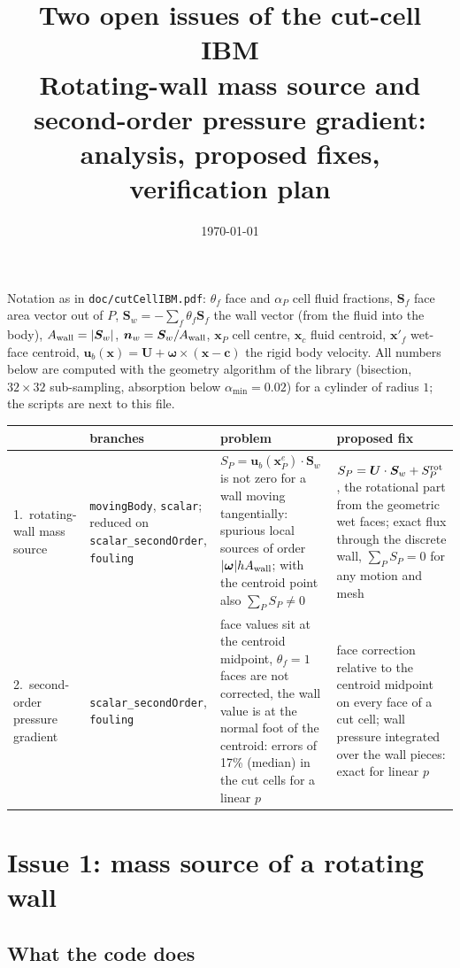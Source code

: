 \documentclass[11pt,a4paper]{article}
\title{\bf Two open issues of the cut-cell IBM\\[3pt]
\large Rotating-wall mass source and second-order pressure gradient:\\
analysis, proposed fixes, verification plan}
\author{}
\date{\today}
\theoremstyle{remark}
\newcommand{\uu}{\bm{u}}
\newcommand{\ub}{\uu_b}
\newcommand{\nn}{\bm{n}}
\newcommand{\xx}{\bm{x}}
\newcommand{\Sf}{\bm{S}_f}
\newcommand{\Sw}{\bm{S}_w}
\newcommand{\Aw}{A_{\rm wall}}
\newcommand{\code}[1]{\texttt{#1}}
\newcommand{\w}{\bm\omega}
\begin{document}
\maketitle

\noindent Notation as in \code{doc/cutCellIBM.pdf}: $\theta_f$ face and $\alpha_P$ cell fluid
fractions, $\Sf$ face area vector out of $P$, $\Sw=-\sum_f\theta_f\Sf$ the wall vector (from the
fluid into the body), $\Aw=|\Sw|$, $\nn_w=\Sw/\Aw$, $\xx_P$ cell centre, $\xx_c$ fluid centroid,
$\xx'_f$ wet-face centroid, $\ub(\xx)=\bm U+\w\times(\xx-\bm c)$ the rigid body velocity.
All numbers below are computed with the geometry algorithm of the library (bisection,
$32\times32$ sub-sampling, absorption below $\alpha_{\min}=0.02$) for a cylinder of radius $1$;
the scripts are next to this file.

\begin{table}[h]\centering\small
\begin{tabular}{@{}p{2.6cm}p{3.6cm}p{4.1cm}p{4.3cm}@{}}
\toprule
& branches & problem & proposed fix\\
\midrule
1.~rotating-wall mass source & \code{movingBody}, \code{scalar}; reduced on \code{scalar\_secondOrder}, \code{fouling}
& $S_P=\ub(\xx^e_P)\cdot\Sw$ is not zero for a wall moving tangentially: spurious local sources of
order $|\w|h\Aw$; with the centroid point also $\sum_PS_P\neq0$
& $S_P=\bm U\cdot\Sw+S^{\rm rot}_P$, the rotational part from the geometric wet faces;
exact flux through the discrete wall, $\sum_PS_P=0$ for any motion and mesh\\[3pt]
2.~second-order pressure gradient & \code{scalar\_secondOrder}, \code{fouling}
& face values sit at the centroid midpoint, $\theta_f=1$ faces are not corrected, the wall value
is at the normal foot of the centroid: errors of 17\% (median) in the cut cells for a linear $p$
& face correction relative to the centroid midpoint on every face of a cut cell; wall pressure
integrated over the wall pieces: exact for linear $p$\\
\bottomrule
\end{tabular}
\end{table}

\section{Issue 1: mass source of a rotating wall}

\subsection{What the code does}
\end{document}
